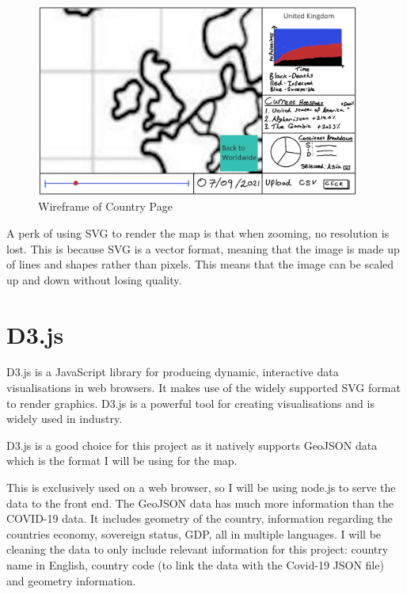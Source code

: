 \documentclass{report}
\begin{document}
\begin{center}
    \begin{figure}[h]
        \centering
        \includegraphics[width=0.95\textwidth]{Images/Country_Wireframe.png}
        \caption{Wireframe of Country Page}
        \label{fig:wireframe_country}
    \end{figure}
\end{center}
A perk of using SVG to render the map is that when zooming, no resolution is lost. This is because SVG is a vector format, meaning that the image is made up of lines and shapes rather than pixels. This means that the image can be scaled up and down without losing quality.
\section{D3.js}
D3.js is a JavaScript library for producing dynamic, interactive data visualisations in web browsers. It makes use of the widely supported SVG format to render graphics. D3.js is a powerful tool for creating visualisations and is widely used in industry.

D3.js is a good choice for this project as it natively supports GeoJSON data which is the format I will be using for the map. \cite{geojsonvectormaps}

This is exclusively used on a web browser, so I will be using node.js to serve the data to the front end.
\newpage
The GeoJSON data has much more information than the COVID-19 data. It includes geometry of the country, information regarding the countries economy, sovereign status, GDP, all in multiple languages. I will be cleaning the data to only include relevant information for this project: country name in English, country code (to link the data with the Covid-19 JSON file) and geometry information. 
\end{document}
